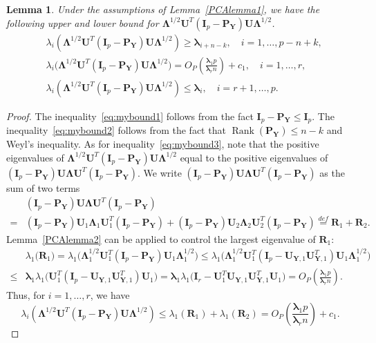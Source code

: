\documentclass[12pt]{article} %
\DeclareMathOperator{\myrank}{Rank}
\newcommand{\bP}{\mathbf{P}}
\newcommand{\bY}{\mathbf{Y}}
\newcommand{\bR}{\mathbf{R}}
\newcommand{\bI}{\mathbf{I}}
\newcommand{\bU}{\mathbf{U}}
\newcommand{\bfsym}[1]{\ensuremath{\boldsymbol{#1}}}
\def\blambda {\bfsym {\lambda}}
\def\bLambda {\bfsym {\Lambda}}
\newtheorem{lemma}{Lemma}
\theoremstyle{definition}
\begin{document}
\begin{lemma}\label{gg:Lemma1}
    Under the assumptions of Lemma~\ref{PCAlemma1},
    we have the following upper and lower bound for $\bLambda^{1/2}\bU^T (\bI_p-\bP_{\bY})\bU\bLambda^{1/2}$.
    \begin{align}
        &\lambda_i (\bLambda^{1/2}\bU^T (\bI_p-\bP_{\bY})\bU\bLambda^{1/2})\geq
        \blambda_{i+n-k},\quad 
        \text{$i=1,\ldots, p-n+k$},
        \label{eq:mybound2}\\
        &\lambda_i\big(\bLambda^{1/2}\bU^T (\bI_p-\bP_{\bY})\bU\bLambda^{1/2}\big)= O_P(\frac{\blambda_1 p}{\blambda_r n}) + c_1,\quad
        \text{$i=1,\ldots, r$},\label{eq:mybound3}\\
        &\lambda_i (\bLambda^{1/2}\bU^T (\bI_p-\bP_{\bY})\bU\bLambda^{1/2})\leq
        \blambda_i, \quad 
        \text{$i=r+1,\ldots, p$}.\label{eq:mybound1}
    \end{align}
\end{lemma}
\begin{proof}
    The inequality~\eqref{eq:mybound1} follows from the fact $\bI_p-\bP_{\bY}\leq \bI_p$.
    The inequality~\eqref{eq:mybound2} follows from the fact that $\myrank(\bP_{\bY})\leq n-k$ and Weyl's inequality.
    As for inequality~\eqref{eq:mybound3}, note that the positive eigenvalues of $\bLambda^{1/2}\bU^T (\bI_p-\bP_{\bY})\bU\bLambda^{1/2}$  equal to the positive eigenvalues of $(\bI_p-\bP_{\bY})\bU\bLambda \bU^T (\bI_p-\bP_{\bY})$.
We write $(\bI_p-\bP_{\bY})\bU\bLambda \bU^T (\bI_p-\bP_{\bY})$ as the sum of two terms
$$
\begin{aligned}
&(\bI_p-\bP_{\bY})\bU\bLambda \bU^T (\bI_p-\bP_{\bY})
\\
=&
(\bI_p-\bP_{\bY})\bU_1\bLambda_1 \bU_1^T(\bI_p-\bP_{\bY})+(\bI_p-\bP_{\bY})\bU_2\bLambda_2 \bU_2^T (\bI_p-\bP_{\bY})
\overset{def}{=}\bR_1+\bR_2.
\end{aligned}
$$
Lemma~\ref{PCAlemma2} can be applied to control the largest eigenvalue of $\bR_1$:
$$
\begin{aligned}
&\lambda_{1}\big( \bR_1 \big)
=
\lambda_{1}\big(\bLambda_1^{1/2} \bU_1^T(\bI_p-\bP_{\bY}) \bU_1 \bLambda_1^{1/2}\big)
\leq 
\lambda_{1}\big(\bLambda_1^{1/2} \bU_1^T(\bI_p-\bU_{\bY,1}\bU_{\bY,1}^T) \bU_1 \bLambda_1^{1/2}\big)\\
\leq &
\blambda_1
\lambda_{1}\big(\bU_1^T(\bI_p-\bU_{\bY,1}\bU_{\bY,1}^T) \bU_1 \big)
= 
\blambda_1
\lambda_{1}\big(\bI_r - \bU_1^T\bU_{\bY,1}\bU_{\bY,1}^T \bU_1 \big)
=
O_P(\frac{\blambda_1 p}{\blambda_r n}).
\end{aligned}
$$
Thus, for $i=1,\ldots, r$, we have
    $$\lambda_i(\bLambda^{1/2}\bU^T (\bI_p-\bP_{\bY})\bU\bLambda^{1/2})
        \leq \lambda_1(\bR_1)+\lambda_1(\bR_2)= O_P(\frac{\blambda_1 p}{\blambda_r n}) + c_1.
    $$
\end{proof}
\end{document}
